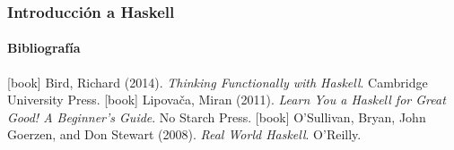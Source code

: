 \documentclass{beamer}
\begin{document}
\begin{frame}
  \frametitle{Introducción a Haskell}
  \framesubtitle{Bibliografía}

  \begin{thebibliography}{O'Sullivan, Goerzen, and Stewart 2008}
  [book]
    Bird, Richard (2014).
    \newblock \emph{Thinking Functionally with Haskell}.
    \newblock Cambridge University Press.
  [book]
    Lipovača, Miran (2011).
    \newblock \emph{Learn You a Haskell for Great Good! A Beginner's Guide}.
    \newblock No Starch Press.
  [book]
    O'Sullivan, Bryan, John Goerzen, and Don Stewart (2008).
    \newblock \emph{Real World Haskell}.
    \newblock O'Reilly.
  \end{thebibliography}
\end{frame}

\end{document}
